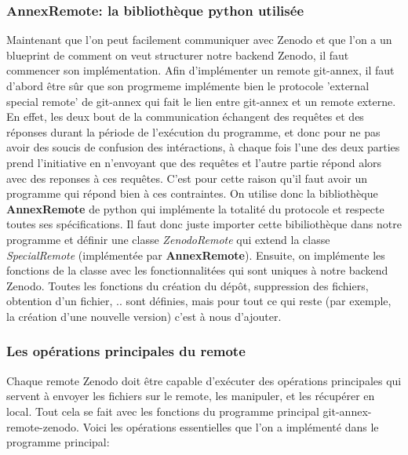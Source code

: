 \documentclass[11pt]{article}
\begin{document}
\subsubsection{AnnexRemote: la bibliothèque python utilisée}
\label{sec:orge79622e}
Maintenant que l'on peut facilement communiquer avec Zenodo et que
l'on a un blueprint de comment on veut structurer notre backend
Zenodo, il faut commencer son implémentation.
Afin d'implémenter un remote git-annex, il faut d'abord être sûr que
son progrmeme implémente bien le protocole 'external special remote' de
git-annex qui fait le lien entre git-annex et un remote externe. En
effet, les deux bout de la communication échangent des requêtes et des
réponses durant la période de l'exécution du programme, et donc pour
ne pas avoir des soucis de confusion des intéractions, à chaque fois
l'une des deux parties prend l'initiative en n'envoyant que des
requêtes et l'autre partie répond alors avec des reponses à ces requêtes. 
C'est pour cette raison qu'il faut avoir un programme qui répond bien
à ces contraintes. On utilise donc la bibliothèque \textbf{AnnexRemote} de
python qui implémente la totalité du protocole et respecte toutes ses
spécifications. Il faut donc juste importer cette bibiliothèque dans
notre programme et définir une classe \emph{ZenodoRemote} qui extend la classe
\emph{SpecialRemote} (implémentée par \textbf{AnnexRemote}). Ensuite, on implémente
les fonctions de la classe avec les fonctionnalitées qui sont uniques
à notre backend Zenodo. Toutes les fonctions du création du dépôt,
suppression des fichiers, obtention d'un fichier, .. sont définies,
mais pour tout ce qui reste (par exemple, la création d'une nouvelle
version) c'est à nous d'ajouter.

\subsubsection{Les opérations principales du remote}
\label{sec:org095d06b}
Chaque remote Zenodo doit être capable d'exécuter des opérations
principales qui servent à envoyer les fichiers sur le remote, les
manipuler, et les récupérer en local. Tout cela se fait avec les
fonctions du programme principal git-annex-remote-zenodo. Voici les
opérations essentielles que l'on a implémenté dans le programme
principal:
\end{document}
